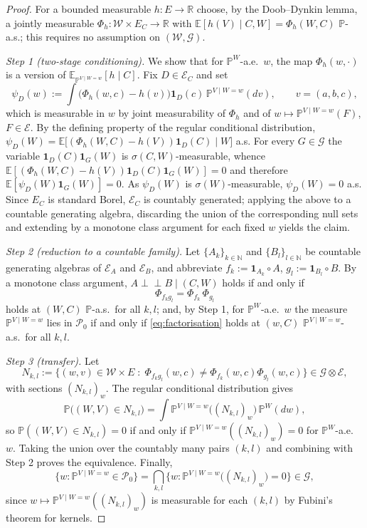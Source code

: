 \documentclass[twoside,11pt]{article}
\newcommand{\indep}{\perp \!\!\! \perp}
\begin{document}
\begin{proof}
For a bounded measurable $h:E\to\mathbb{R}$ choose, by the Doob--Dynkin lemma, a
jointly measurable $\Phi_h:\mathcal{W}\times E_C\to\mathbb{R}$ with
$\mathbb{E}[h(V)\mid C,W]=\Phi_h(W,C)$ $\mathbb{P}$-a.s.; this requires no
assumption on $(\mathcal{W},\mathcal{G})$.

\emph{Step 1 (two-stage conditioning).} We show that for
$\mathbb{P}^W$-a.e.\ $w$, the map $\Phi_h(w,\cdot)$ is a version of
$\mathbb{E}_{\mathbb{P}^{V\mid W=w}}[h\mid C]$. Fix $D\in\mathcal{E}_C$ and set
\[
  \psi_D(w) := \int \bigl(\Phi_h(w,c)-h(v)\bigr)\mathbf{1}_D(c)\,
  \mathbb{P}^{V\mid W=w}(dv), \qquad v=(a,b,c),
\]
which is measurable in $w$ by joint measurability of $\Phi_h$ and of
$w\mapsto\mathbb{P}^{V\mid W=w}(F)$, $F\in\mathcal{E}$. By the defining property
of the regular conditional distribution,
$\psi_D(W)=\mathbb{E}\bigl[(\Phi_h(W,C)-h(V))\mathbf{1}_D(C)\mid W\bigr]$ a.s.
For every $G\in\mathcal{G}$ the variable $\mathbf{1}_D(C)\mathbf{1}_G(W)$ is
$\sigma(C,W)$-measurable, whence
$\mathbb{E}[(\Phi_h(W,C)-h(V))\mathbf{1}_D(C)\mathbf{1}_G(W)]=0$ and therefore
$\mathbb{E}[\psi_D(W)\mathbf{1}_G(W)]=0$. As $\psi_D(W)$ is
$\sigma(W)$-measurable, $\psi_D(W)=0$ a.s. Since $E_C$ is standard Borel,
$\mathcal{E}_C$ is countably generated; applying the above to a countable
generating algebra, discarding the union of the corresponding null sets and
extending by a monotone class argument for each fixed $w$ yields the claim.

\emph{Step 2 (reduction to a countable family).} Let $\{A_k\}_{k\in\mathbb{N}}$
and $\{B_l\}_{l\in\mathbb{N}}$ be countable generating algebras of
$\mathcal{E}_A$ and $\mathcal{E}_B$, and abbreviate
$f_k := \mathbf{1}_{A_k}\circ A$, $g_l := \mathbf{1}_{B_l}\circ B$. By a monotone
class argument, $A\indep B\mid(C,W)$ holds if and only if
\begin{equation}\label{eq:factorisation}
  \Phi_{f_kg_l} = \Phi_{f_k}\,\Phi_{g_l}
\end{equation}
holds at $(W,C)$ $\mathbb{P}$-a.s.\ for all $k,l$; and, by Step 1, for
$\mathbb{P}^W$-a.e.\ $w$ the measure $\mathbb{P}^{V\mid W=w}$ lies in
$\mathcal{P}_0$ if and only if \eqref{eq:factorisation} holds at $(w,C)$
$\mathbb{P}^{V\mid W=w}$-a.s.\ for all $k,l$.

\emph{Step 3 (transfer).} Let
\[
  N_{k,l} := \bigl\{(w,v)\in\mathcal{W}\times E \;:\;
  \Phi_{f_kg_l}(w,c) \neq \Phi_{f_k}(w,c)\Phi_{g_l}(w,c) \bigr\}
  \in \mathcal{G}\otimes\mathcal{E},
\]
with sections $(N_{k,l})_w$. The regular conditional distribution gives
\[
  \mathbb{P}\bigl((W,V)\in N_{k,l}\bigr)
  = \int \mathbb{P}^{V\mid W=w}\bigl((N_{k,l})_w\bigr)\,\mathbb{P}^W(dw),
\]
so $\mathbb{P}((W,V)\in N_{k,l})=0$ if and only if
$\mathbb{P}^{V\mid W=w}((N_{k,l})_w)=0$ for $\mathbb{P}^W$-a.e.\ $w$. Taking the
union over the countably many pairs $(k,l)$ and combining with Step 2 proves the
equivalence. Finally,
\[
  \bigl\{w:\mathbb{P}^{V\mid W=w}\in\mathcal{P}_0\bigr\}
  = \bigcap_{k,l}\bigl\{w: \mathbb{P}^{V\mid W=w}\bigl((N_{k,l})_w\bigr)=0\bigr\}
  \in\mathcal{G},
\]
since $w\mapsto\mathbb{P}^{V\mid W=w}((N_{k,l})_w)$ is measurable for each
$(k,l)$ by Fubini's theorem for kernels.
\end{proof}
\end{document}
